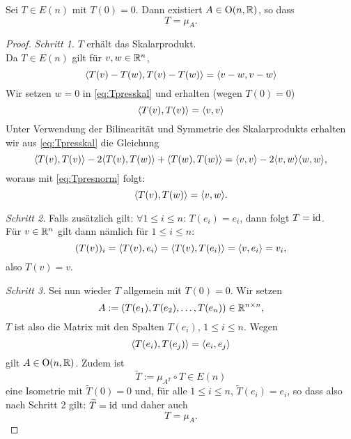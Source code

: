 \documentclass{book}
\begin{document}
\begin{thm}
    \label{thm:klassifikation}
    Sei $T \in E(n)$ mit $T(0) = 0$. Dann existiert $A \in \operatorname{O}(n,\mathbb{R})$, so dass
    \[
        T = \mu_A.
    \]
\end{thm}
\begin{proof}
    \noindent
    \emph{Schritt 1.} $T$ erhält das Skalarprodukt.\\

    Da $T \in E(n)$ gilt für $v,w \in \mathbb{R}^n$, 
    \begin{equation}
        \label{eq:Tpresskal}
        \langle T(v) - T(w), T(v) - T(w) \rangle = \langle v-w,v-w \rangle
    \end{equation}
    Wir setzen  $w = 0$ in \eqref{eq:Tpresskal} und erhalten (wegen $T(0) = 0$)
    \begin{equation}
        \label{eq:Tpresnorm}
        \langle T(v),T(v) \rangle = \langle v,v \rangle
    \end{equation}
    Unter Verwendung der Bilinearität und Symmetrie des Skalarprodukts erhalten wir aus \eqref{eq:Tpresskal} die Gleichung
    \[
        \langle T(v),T(v) \rangle
        -2\langle T(v),T(w) \rangle
        +\langle T(w),T(w) \rangle
        =
        \langle v,v \rangle
        -2\langle v,w \rangle
        \langle w,w \rangle,
    \]
    woraus mit \eqref{eq:Tpresnorm} folgt:
    \begin{equation}
        \label{eq:Tpressk}
        \langle T(v), T(w) \rangle = \langle v,w \rangle.
    \end{equation}

    \noindent
    \emph{Schritt 2.} Falls zusätzlich gilt: $\forall 1 \le i \le n$: $T(e_i) = e_i$, dann folgt $T = \operatorname{id}$.\\

    Für $v \in \mathbb{R}^n$ gilt dann nämlich für $1 \le i \le n$: 
    \[
        (T(v))_i = \langle T(v), e_i \rangle = \langle T(v),T(e_i) \rangle = \langle v,e_i \rangle = v_i,
    \]
    also $T(v) = v$. 

    \noindent
    \emph{Schritt 3.} Sei nun wieder $T$ allgemein mit $T(0) = 0$. Wir setzen 
    \[
        A := \left(T(e_1), T(e_2), \dots, T(e_n)\right) \in \mathbb{R}^{n \times n},
    \]
    $T$ ist also die Matrix mit den Spalten $T(e_i)$, $1 \le i \le n$. Wegen
    \[
        \langle T(e_i),T(e_j) \rangle = \langle e_i,e_j \rangle
    \]
    gilt $A \in \operatorname{O}(n,\mathbb{R})$. Zudem ist 
    \[
        \widetilde{T} := \mu_{A^T} \circ T \in E(n)
    \]
    eine Isometrie mit $\widetilde{T}(0) = 0$ und, für alle $1 \le i \le n$,
    $\widetilde{T}(e_i) = e_i$, so dass also nach Schritt 2 gilt: $\widetilde{T} =
    \operatorname{id}$ und daher auch
    \[
        T = \mu_A.
    \]
\end{proof}
\end{document}
